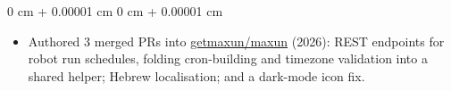 \documentclass[10pt, letterpaper]{article}
\newenvironment{highlights}{
    \begin{itemize}[
        topsep=0.10 cm,
        parsep=0.10 cm,
        partopsep=0pt,
        itemsep=0pt,
        leftmargin=0 cm + 10pt
    ]
}{
    \end{itemize}
} %
\newenvironment{onecolentry}{
    \begin{adjustwidth}{
        0 cm + 0.00001 cm
    }{
        0 cm + 0.00001 cm
    }
}{
    \end{adjustwidth}
} %
\newenvironment{twocolentry}[2][]{
    \onecolentry
    \def\secondColumn{#2}
    \setcolumnwidth{\fill, 4.5 cm}
    \begin{paracol}{2}
}{
    \switchcolumn \raggedleft \secondColumn
    \end{paracol}
    \endonecolentry
} %
\begin{document}
        \vspace{0.10 cm}
        \begin{onecolentry}
            \begin{highlights}
                \item Authored 3 merged PRs into \href{https://github.com/getmaxun/maxun}{getmaxun/maxun} (2026): REST endpoints for robot run schedules, folding cron-building and timezone validation into a shared helper; Hebrew localisation; and a dark-mode icon fix.
            \end{highlights}
        \end{onecolentry}




            
                
                
                
        
\end{document}
